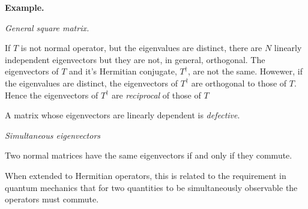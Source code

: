 \documentclass{article}
\begin{document}
\textbf{Example.}



\textit{General square matrix.}

If $T$ is not normal operator, but the eigenvalues are distinct, there are $N$ linearly independent eigenvectors but they are not, in general, orthogonal. The eigenvectors of $T$ and it's Hermitian conjugate, $T^\dag$, are not the same. Howewer, if the eigenvalues are distinct, the eigenvectors of $T^\dag$ are orthogonal to those of $T$. Hence the eigenvectors of $T^\dag$ are \textit{reciprocal} of those of $T$

A matrix whose eigenvectors are linearly dependent is \textit{defective}.

\textit{Simultaneous eigenvectors}

Two normal matrices have the same eigenvectors if and only if they commute.

When extended to Hermitian operators, this is related to the requirement in quantum mechanics that for two quantities to be simultaneously observable the operators must commute.
\end{document}
